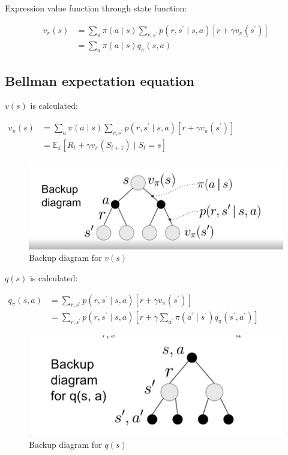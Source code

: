 \documentclass[a4paper,12pt]{article}
\begin{document}
	Expression value function through state function:
	
	$$
	\begin{aligned}
		v_\pi(s) & =\sum_a \pi(a \mid s) \sum_{r, s^{\prime}} p\left(r, s^{\prime} \mid s, a\right)\left[r+\gamma v_\pi\left(s^{\prime}\right)\right] \\
		& =\sum_a \pi(a \mid s) q_\pi(s, a)
	\end{aligned}
	$$
	
	\subsection{Bellman expectation equation}
	
	$v(s)$ is calculated: 
	
	$\begin{aligned} v_\pi(s) & =\sum_a \pi(a \mid s) \sum_{r, s^{\prime}} p\left(r, s^{\prime} \mid s, a\right)\left[r+\gamma v_\pi\left(s^{\prime}\right)\right] \\ & =\mathbb{E}_\pi\left[R_t+\gamma v_\pi\left(S_{t+1}\right) \mid S_t=s\right]\end{aligned}$
	
	\begin{figure}[H]
		\centering
		\includegraphics[width=1\linewidth]{../Image/screenshot002}
		\caption{Backup diagram for $v(s)$}
		\label{fig:screenshot002}
	\end{figure}
	
	$q(s)$ is calculated:
	
	$\begin{aligned} q_\pi(s, a) & =\sum_{r, s^{\prime}} p\left(r, s^{\prime} \mid s, a\right)\left[r+\gamma v_\pi\left(s^{\prime}\right)\right] \\ & =\sum_{r, s^{\prime}} p\left(r, s^{\prime} \mid s, a\right)\left[r+\gamma \sum_{a^{\prime}} \pi\left(a^{\prime} \mid s^{\prime}\right) q_\pi\left(s^{\prime}, a^{\prime}\right)\right]\end{aligned}$
	
	\begin{figure}
		\centering
		\includegraphics[width=1\linewidth]{../Image/screenshot003}
		\caption{Backup diagram for $q(s)$}
		\label{fig:screenshot003}
	\end{figure}
	
\end{document}
